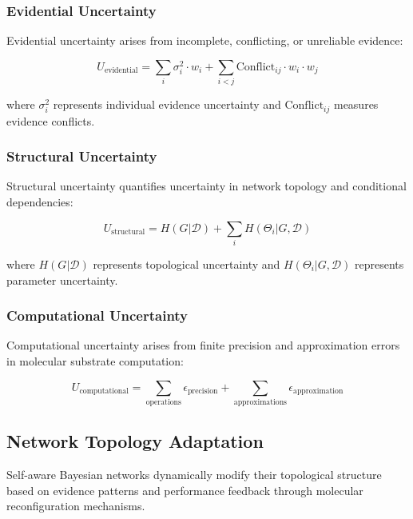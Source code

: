 \documentclass[12pt,a4paper]{article}
\begin{document}
\subsubsection{Evidential Uncertainty}

Evidential uncertainty arises from incomplete, conflicting, or unreliable evidence:

\begin{equation}
U_{\text{evidential}} = \sum_i \sigma_i^2 \cdot w_i + \sum_{i<j} \text{Conflict}_{ij} \cdot w_i \cdot w_j
\end{equation}

where $\sigma_i^2$ represents individual evidence uncertainty and $\text{Conflict}_{ij}$ measures evidence conflicts.

\subsubsection{Structural Uncertainty}

Structural uncertainty quantifies uncertainty in network topology and conditional dependencies:

\begin{equation}
U_{\text{structural}} = H(G | \mathcal{D}) + \sum_{i} H(\Theta_i | G, \mathcal{D})
\end{equation}

where $H(G | \mathcal{D})$ represents topological uncertainty and $H(\Theta_i | G, \mathcal{D})$ represents parameter uncertainty.

\subsubsection{Computational Uncertainty}

Computational uncertainty arises from finite precision and approximation errors in molecular substrate computation:

\begin{equation}
U_{\text{computational}} = \sum_{\text{operations}} \epsilon_{\text{precision}} + \sum_{\text{approximations}} \epsilon_{\text{approximation}}
\end{equation}

\subsection{Network Topology Adaptation}

Self-aware Bayesian networks dynamically modify their topological structure based on evidence patterns and performance feedback through molecular reconfiguration mechanisms.
\end{document}

